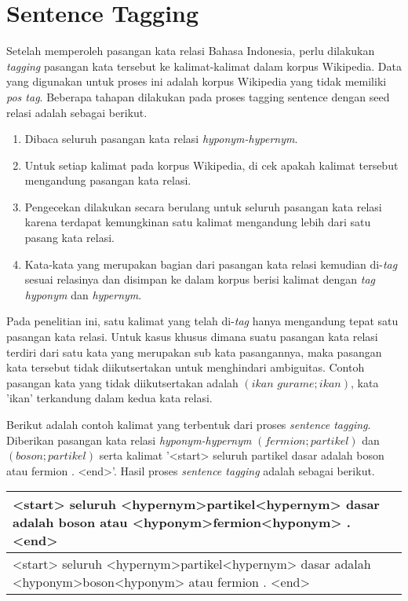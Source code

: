 \section{Sentence Tagging}
Setelah memperoleh pasangan kata relasi Bahasa Indonesia, perlu dilakukan \textit{tagging} pasangan kata tersebut ke kalimat-kalimat dalam korpus Wikipedia. Data yang digunakan untuk proses ini adalah korpus Wikipedia yang tidak memiliki \textit{pos tag}. Beberapa tahapan dilakukan pada proses tagging sentence dengan seed relasi adalah sebagai berikut.
\begin{enumerate}
  \item Dibaca seluruh pasangan kata relasi \textit{hyponym-hypernym}.
  \item Untuk setiap kalimat pada korpus Wikipedia, di cek apakah kalimat tersebut mengandung pasangan kata relasi.
  \item Pengecekan dilakukan secara berulang untuk seluruh pasangan kata relasi karena terdapat kemungkinan satu kalimat mengandung lebih dari satu pasang kata relasi.
  \item Kata-kata yang merupakan bagian dari pasangan kata relasi kemudian di-\textit{tag} sesuai relasinya dan disimpan ke dalam korpus berisi kalimat dengan \textit{tag} \textit{hyponym} dan \textit{hypernym}.
\end{enumerate}

Pada penelitian ini, satu kalimat yang telah di-\textit{tag} hanya mengandung tepat satu pasangan kata relasi. Untuk kasus khusus dimana suatu pasangan kata relasi terdiri dari satu kata yang merupakan sub kata pasangannya, maka pasangan kata tersebut tidak diikutsertakan untuk menghindari ambiguitas. Contoh pasangan kata yang tidak diikutsertakan adalah $(ikan\,\,gurame;ikan)$, kata 'ikan' terkandung dalam kedua kata relasi. 

Berikut adalah contoh kalimat yang terbentuk dari proses \textit{sentence tagging}. Diberikan pasangan kata relasi \textit{hyponym-hypernym} $(fermion;partikel)$ dan $(boson;partikel)$ serta kalimat  '<start> seluruh partikel dasar adalah boson atau fermion . <end>'. Hasil proses \textit{sentence tagging} adalah sebagai berikut.
\begin{center}
\begin{tabular}{ | m{32em} | } 
\hline
<start> seluruh <hypernym>partikel<hypernym> dasar adalah boson atau <hyponym>fermion<hyponym> . <end> \\ 
\hline
\hline
<start> seluruh <hypernym>partikel<hypernym> dasar adalah <hyponym>boson<hyponym> atau fermion . <end> \\ 
\hline
\end{tabular}
\end{center}


